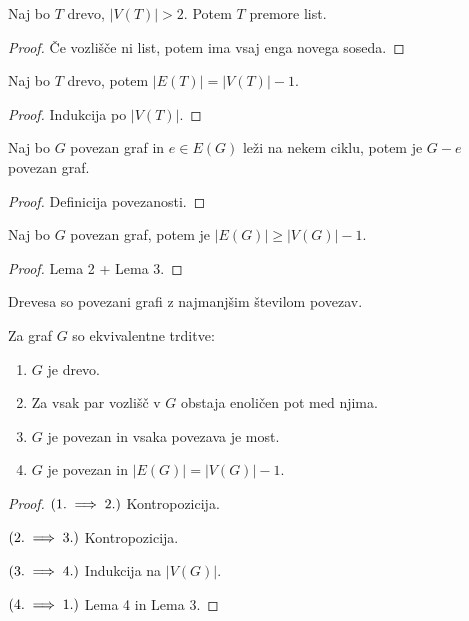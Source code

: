 \begin{lema}
    Naj bo $T$ drevo, $|V(T)| > 2$. Potem $T$ premore list.
\end{lema}

\begin{proof}
    Če vozlišče ni list, potem ima vsaj enga novega soseda.
\end{proof}

\begin{lema}
    Naj bo $T$ drevo, potem $|E(T)| = |V(T)| - 1$.
\end{lema}

\begin{proof}
    Indukcija po $|V(T)|$.
\end{proof}

\begin{lema}
    Naj bo $G$ povezan graf in $e \in E(G)$ leži na nekem ciklu, potem je $G-e$ povezan graf.
\end{lema}

\begin{proof}
    Definicija povezanosti.
\end{proof}

\begin{lema}
    Naj bo $G$ povezan graf, potem je $|E(G)| \geq |V(G)| -1$.
\end{lema}

\begin{proof}
    Lema 2 + Lema 3.
\end{proof}

\begin{opomba}
    Drevesa so povezani grafi z najmanjšim številom povezav.
\end{opomba}

\begin{izrek}
    Za graf $G$ so ekvivalentne trditve:
    \begin{enumerate}
        \item $G$ je drevo.
        \item Za vsak par vozlišč v $G$ obstaja enoličen pot med njima.
        \item $G$ je povezan in vsaka povezava je most.
        \item $G$ je povezan in $|E(G)| = |V(G)|-1$.
    \end{enumerate}
\end{izrek}

\begin{proof}
    $(1. \implies 2.)$ Kontropozicija.

    $(2. \implies 3.)$ Kontropozicija.

    $(3. \implies 4.)$ Indukcija na $|V(G)|$.

    $(4. \implies 1.)$ Lema 4 in Lema 3.
\end{proof}

